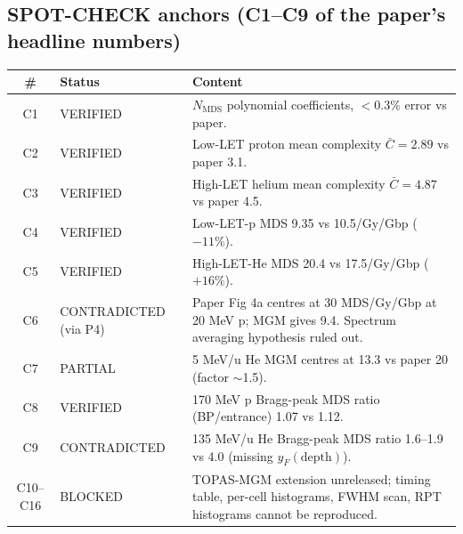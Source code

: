 \documentclass[11pt]{article}
\begin{document}
\subsection{SPOT-CHECK anchors (C1--C9 of the paper's headline numbers)}
\begin{longtable}{clp{9cm}}
\toprule
\# & Status & Content \\
\midrule
C1 & VERIFIED & $N_{\text{MDS}}$ polynomial coefficients, $<0.3\%$ error vs paper. \\
C2 & VERIFIED & Low-LET proton mean complexity $\bar C = 2.89$ vs paper 3.1. \\
C3 & VERIFIED & High-LET helium mean complexity $\bar C = 4.87$ vs paper 4.5. \\
C4 & VERIFIED & Low-LET-p MDS 9.35 vs 10.5/Gy/Gbp ($-11\%$). \\
C5 & VERIFIED & High-LET-He MDS 20.4 vs 17.5/Gy/Gbp ($+16\%$). \\
C6 & CONTRADICTED (via P4) & Paper Fig 4a centres at 30 MDS/Gy/Gbp at 20 MeV p; MGM gives 9.4. Spectrum averaging hypothesis ruled out. \\
C7 & PARTIAL & 5 MeV/u He MGM centres at 13.3 vs paper 20 (factor $\sim$1.5). \\
C8 & VERIFIED & 170 MeV p Bragg-peak MDS ratio (BP/entrance) 1.07 vs 1.12. \\
C9 & CONTRADICTED & 135 MeV/u He Bragg-peak MDS ratio 1.6--1.9 vs 4.0 (missing $y_F(\text{depth})$). \\
C10--C16 & BLOCKED & TOPAS-MGM extension unreleased; timing table, per-cell histograms, FWHM scan, RPT histograms cannot be reproduced. \\
\bottomrule
\end{longtable}
\end{document}
